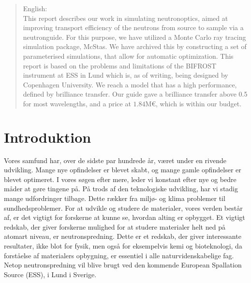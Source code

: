 \documentclass[12pt,oneside,a4paper]{article}
\begin{document}
{{{{{\begin{abstract}
English:
\\
This report describes our work in simulating neutronoptics, aimed at improving transport efficiency of the neutrons from source to sample via a neutronguide. For this purpose, we have utilized a Monte Carlo ray tracing simulation package, McStas. We have archived this by constructing a set of parameterised simulations, that allow for automatic optimization. This report is based on the problems and limitations of the BIFROST instrument at ESS in Lund which is, as of writing, being designed by Copenhagen University. We reach a model that has a high performance, defined by brilliance transfer. Our guide gave a brilliance transfer above 0.5 for most wavelengths, and a price at $1.84\text{M€}$, which is within our budget.
\end{abstract}

\newpage

\tableofcontents

\newpage


\section{Introduktion}

Vores samfund har, over de sidste par hundrede år, været under en rivende udvikling. Mange nye opfindelser er blevet skabt, og mange gamle opfindelser er blevet optimeret. I vores søgen efter mere, leder vi konstant efter nye og bedre måder at gøre tingene på. På trods af den teknologiske udvikling, har vi stadig mange udfordringer tilbage. Dette rækker fra miljø- og klima problemer til sundhedsproblemer. For at udvikle og studere de materialer, vores verden består af, er det vigtigt for forskerne at kunne se, hvordan alting er opbygget. Et vigtigt redskab, der giver forskerne mulighed for at studere materialer helt ned på atomart niveau, er neutronspredning. Dette er et redskab, der giver interessante resultater, ikke blot for fysik, men også for eksempelvis kemi og bioteknologi, da forståelse af materialers opbygning, er essentiel i alle naturvidenskabelige fag. Netop neutronspredning vil blive brugt ved den kommende European Spallation Source (ESS), i Lund i Sverige. \cite{ess_folder} \cite{ess_hjemmeside}

}}}}}
\end{document}
